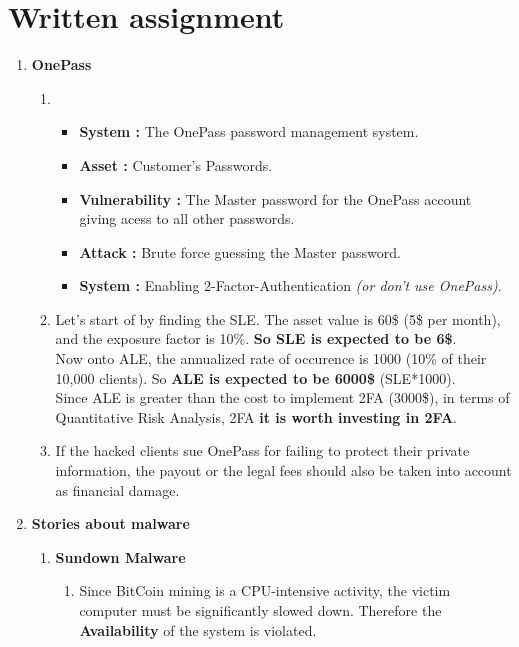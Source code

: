 \documentclass[12pt]{article}
\begin{document}
\maketitle

\section*{Written assignment}
\begin{enumerate}
	\item \textbf{OnePass}
		\begin{enumerate}
			\item 
			\begin{itemize}
			\item \textbf{System :} The OnePass password management system.
			\item \textbf{Asset :} Customer's Passwords.
			\item \textbf{Vulnerability :} The Master password for the OnePass account giving acess to all other passwords.
			\item \textbf{Attack :} Brute force guessing the Master password.
			\item \textbf{System :} Enabling 2-Factor-Authentication \textit{(or don't use OnePass)}.
			\end{itemize}
			\item Let's start of by finding the SLE. The asset value is 60\$ (5\$ per month), and the exposure factor is 10\%. \textbf{So SLE is expected to be 6\$}. \\
			\hspace*{1cm} Now onto ALE, the annualized rate of occurence is 1000 (10\% of their 10,000 clients). So \textbf{ALE is expected to be 6000\$} (SLE*1000). \\
			\hspace*{1cm} Since ALE is greater than the cost to implement 2FA (3000\$), in terms of Quantitative Risk Analysis, 2FA \textbf{it is worth investing in 2FA}.
			\item If the hacked clients sue OnePass for failing to protect their private information, the payout or the legal fees should also be taken into account as financial damage.
		\end{enumerate}
		\item \textbf{Stories about malware}
		\begin{enumerate}
			\item \textbf{Sundown Malware}
			\begin{enumerate}
				\item Since BitCoin mining is a CPU-intensive activity, the victim computer must be significantly slowed down. Therefore the \textbf{Availability} of the system is violated.

\end{enumerate}
\end{enumerate}
\end{enumerate}
\end{document}
